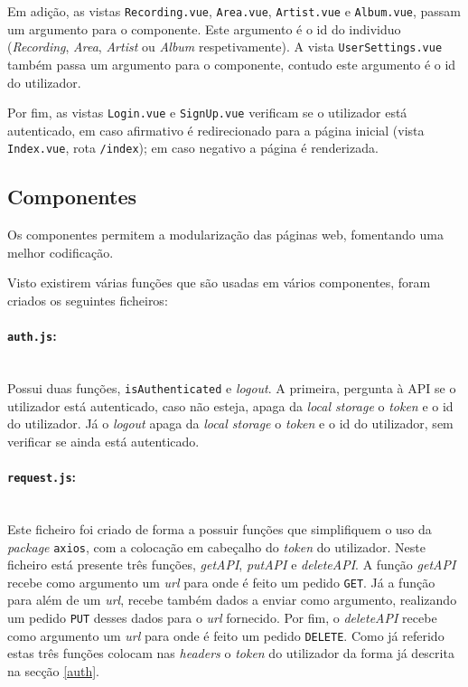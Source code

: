 \documentclass{article}
\begin{document}
Em adição, as vistas \texttt{Recording.vue}, \texttt{Area.vue}, \texttt{Artist.vue} e \texttt{Album.vue}, passam um argumento para o componente. Este argumento é o id do individuo (\textit{Recording}, \textit{Area}, \textit{Artist} ou \textit{Album} respetivamente). A vista \texttt{UserSettings.vue} também passa um argumento para o componente, contudo este argumento é o id do utilizador.

Por fim, as vistas \texttt{Login.vue} e \texttt{SignUp.vue} verificam se o utilizador está autenticado, em caso afirmativo é redirecionado para a página inicial (vista \texttt{Index.vue}, rota \texttt{/index}); em caso negativo a página é renderizada.

\subsection{Componentes}

Os componentes permitem a modularização das páginas web, fomentando uma melhor codificação.

Visto existirem várias funções que são usadas em vários componentes, foram criados os seguintes ficheiros:

\paragraph{\texttt{auth.js}:}\mbox{}\\

Possui duas funções, \texttt{isAuthenticated} e \textit{logout}. A primeira, pergunta à API se o utilizador está autenticado, caso não esteja, apaga da \textit{local storage} o \textit{token} e o id do utilizador. Já o \textit{logout} apaga da \textit{local storage} o \textit{token} e o id do utilizador, sem verificar se ainda está autenticado.

\paragraph{\texttt{request.js}:}\mbox{}\\

Este ficheiro foi criado de forma a possuir funções que simplifiquem o uso da \textit{package} \texttt{axios}, com a colocação em cabeçalho do \textit{token} do utilizador. Neste ficheiro está presente três funções, \textit{getAPI}, \textit{putAPI} e \textit{deleteAPI}. A função \textit{getAPI} recebe como argumento um \textit{url} para onde é feito um pedido \texttt{GET}. Já a função para além de um \textit{url}, recebe também dados a enviar como argumento, realizando um pedido \texttt{PUT} desses dados para o \textit{url} fornecido. Por fim, o \textit{deleteAPI} recebe como argumento um \textit{url} para onde é feito um pedido \texttt{DELETE}. Como já referido estas três funções colocam nas \textit{headers} o \textit{token} do utilizador da forma já descrita na secção \ref{auth}.
\end{document}
